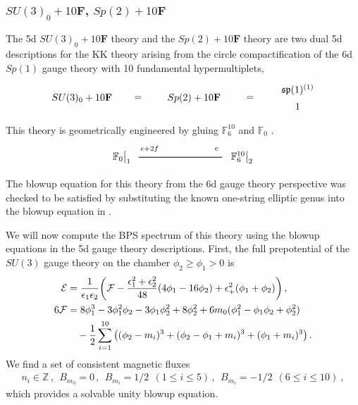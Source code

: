 \subsubsection{\texorpdfstring{$SU(3)_0+10\mathbf{F}$, $Sp(2)+10\mathbf{F}$}{SU(3)0 + 10F}}

The 5d $ SU(3)_0 + 10\mathbf{F} $ theory and the $ Sp(2) + 10\mathbf{F} $ theory are two dual 5d descriptions for the KK theory arising from the circle compactification of the 6d $ Sp(1) $ gauge theory with 10 fundamental hypermultiplets,
\begin{align}
\begin{tikzpicture}
\draw (0, 0) node {$ SU(3)_{0} + 10\mathbf{F} $}
(2, 0) node {$ = $}
(4, 0) node {$ Sp(2) + 10\mathbf{F} $}
(6, 0) node {$ = $}
(7.7, 0.3) node {$ \mathfrak{sp}(1)^{(1)} $}
(7.7, -0.3) node {$ 1 $}
;
\end{tikzpicture}
\end{align}
This theory is geometrically engineered by gluing $ \mathbb{F}_6^{10} $ and $ \mathbb{F}_0 $ \cite{Jefferson:2018irk}.
\begin{align}
\begin{tikzpicture}
\draw[thick](-3,0)--(0,0);	
\node at(-3.6,0) {$\mathbb{F}_{0}{}\big|_1$};
\node at(-2.6,0.3) {${}_{e+2f}$};
\node at(0.7,0) {$\mathbb{F}_{6}^{10}{}\big|_2$};
\node at(-0.2,0.3) {${}_{e}$};
\end{tikzpicture}
\end{align}
The blowup equation for this theory from the 6d gauge theory perspective was checked to be satisfied by substituting the known one-string elliptic genus into the blowup equation  in \cite{Gu:2020fem}.

We will now compute the BPS spectrum of this theory using the blowup equations in the 5d gauge theory descriptions. First, the full prepotential of the $SU(3)$ gauge theory on the chamber $\phi_2\ge \phi_1>0$ is
\begin{align}
\mathcal{E} &= \frac{1}{\epsilon_1 \epsilon_2} \qty(\mathcal{F} - \frac{\epsilon_1^2 + \epsilon_2^2}{48} \qty(4\phi_1 - 16\phi_2 ) + \epsilon_+^2 (\phi_1 + \phi_2) ) \,, \nonumber \\
6\mathcal{F}
&= 8\phi_1^3 - 3\phi_1^2 \phi_2 - 3\phi_1 \phi_2^2 + 8\phi_2^2 + 6m_0 (\phi_1^2 - \phi_1 \phi_2 + \phi_2^2) \nonumber \\
& \quad - \frac{1}{2} \sum_{i=1}^{10} \qty((\phi_2 - m_i)^3 + (\phi_2 - \phi_1 + m_i)^3 + (\phi_1 + m_i)^3) \, .
\end{align}
We find a set of consistent magnetic fluxes
\begin{align}
n_i \in \mathbb{Z} \, , \ \
B_{m_0} = 0 \, , \ \
B_{m_i} = 1/2 \ \ (1 \leq i \leq 5) \, , \ \ 
B_{m_i} = -1/2 \ \ (6 \leq i \leq 10) \ ,
\end{align}
which provides a solvable unity blowup equation.

